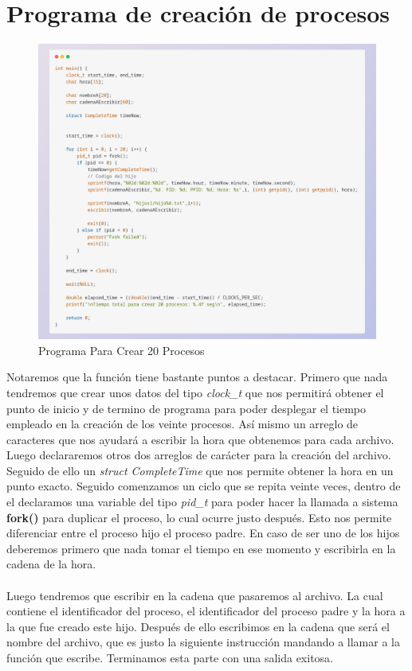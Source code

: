 \documentclass[10pt]{article}
\begin{document}
	\section{Programa de creación de procesos}
	\begin{figure}[h!]
		\centering
		\includegraphics[width=\linewidth]{pvh1.png}
		\caption{Programa Para Crear 20 Procesos}
		\label{fig:pvh1}
	\end{figure}
	Notaremos que la función tiene bastante puntos a destacar. Primero que nada tendremos que crear unos datos del tipo \textit{clock\_t} que nos permitirá obtener el punto de inicio y de termino de programa para poder desplegar el tiempo empleado en la creación de los veinte procesos. Así mismo un arreglo de caracteres que nos ayudará a escribir la hora que obtenemos para cada archivo. 
	Luego declararemos otros dos arreglos de carácter para la creación del archivo. Seguido de ello un \textit{struct CompleteTime} que nos permite obtener la hora en un punto exacto. 
	Seguido comenzamos un ciclo que se repita veinte veces, dentro de el declaramos una variable del tipo \textit{pid\_t} para poder hacer la llamada a sistema \textbf{fork()} para duplicar el proceso, lo cual ocurre justo después. Esto nos permite diferenciar entre el proceso hijo el proceso padre. En caso de ser uno de los hijos deberemos primero que nada tomar el tiempo en ese momento y escribirla en la cadena de la hora. 
	\\\\
	Luego tendremos que escribir en la cadena que pasaremos al archivo. La cual contiene el identificador del proceso, el identificador del proceso padre  y la hora a la que fue creado este hijo. Después de ello escribimos en la cadena que será el nombre del archivo, que es justo la siguiente instrucción mandando a llamar a la función que escribe. Terminamos esta parte con una salida exitosa.
\end{document}
